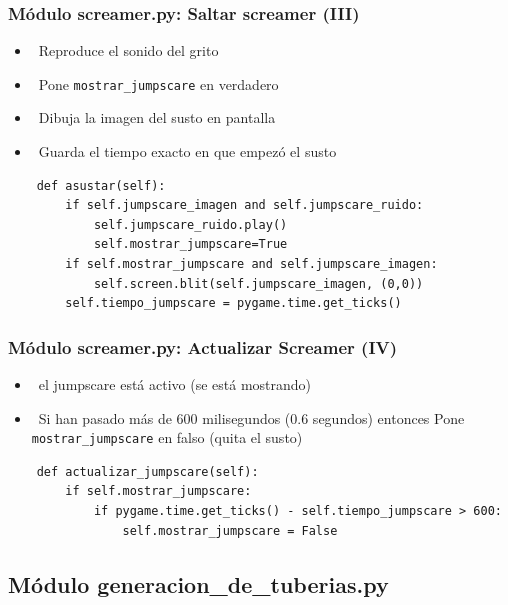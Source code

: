 \documentclass[
	11pt, %
]{beamer}
\begin{document}

\begin{frame}[fragile]
\frametitle{Módulo screamer.py: Saltar screamer (III)}

\begin{itemize}
    \item \ Reproduce el sonido del grito
    \item \ Pone \texttt{mostrar\_jumpscare} en verdadero
    \item \ Dibuja la imagen del susto en pantalla
    \item \ Guarda el tiempo exacto en que empezó el susto
\end{itemize}

\vspace{4pt}
{\scriptsize
\begin{verbatim}
    def asustar(self):
        if self.jumpscare_imagen and self.jumpscare_ruido:
            self.jumpscare_ruido.play()
            self.mostrar_jumpscare=True
        if self.mostrar_jumpscare and self.jumpscare_imagen:
            self.screen.blit(self.jumpscare_imagen, (0,0))
        self.tiempo_jumpscare = pygame.time.get_ticks()
\end{verbatim}
}
\end{frame}


\begin{frame}[fragile]
\frametitle{Módulo screamer.py: Actualizar Screamer (IV)}

\begin{itemize}
    \item \ el jumpscare está activo (se está mostrando)
    \item \  Si han pasado más de 600 milisegundos (0.6 segundos) entonces Pone \texttt{mostrar\_jumpscare} en falso (quita el susto)
\end{itemize}
\vspace{4pt}
{\scriptsize
\begin{verbatim}
    def actualizar_jumpscare(self):
        if self.mostrar_jumpscare:
            if pygame.time.get_ticks() - self.tiempo_jumpscare > 600:
                self.mostrar_jumpscare = False
\end{verbatim}
}
\end{frame}


\subsection{Módulo generacion\_de\_tuberias.py}
\end{document}
